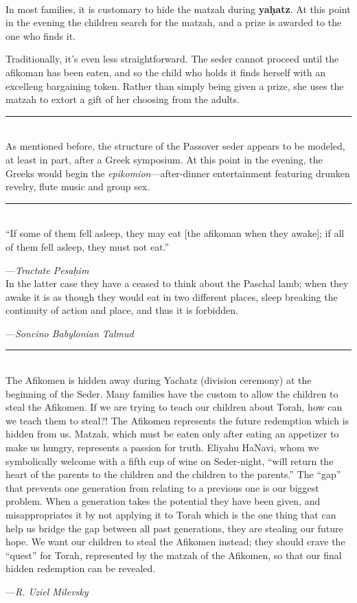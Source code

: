 \documentclass[a4paper,10pt,openany]{memoir}
\newcommand{\HgSource}[1]{\hfill{\small---\itshape{#1}}}
\newcommand{\HgFill}{\vfill \hrule \vfill}
\newenvironment{HgEnglish}{\strut\\\noindent}{\vspace{1em}}
\begin{document}
\begin{HgEnglish}
In most families, it is customary to hide the matzah during {\bfseries
ya\d{h}atz}. At this point in the evening the children search for the matzah,
and a prize is awarded to the one who finds it.

Traditionally, it's even less straightforward. The seder cannot proceed until
the afikoman has been eaten, and so the child who holds it finds herself with an
excelleng bargaining token. Rather than simply being given a prize, she uses the
matzah to extort a gift of her choosing from the adults.
\end{HgEnglish}

\HgFill

\begin{HgEnglish}
  As mentioned before, the structure of the Passover seder appears to be
  modeled, at least in part, after a Greek symposium. At this point in the
  evening, the Greeks would begin the {\itshape epikomion}---after-dinner
  entertainment featuring drunken revelry, flute music and group sex.
\end{HgEnglish}

\HgFill

\begin{HgEnglish}
``If some of them fell asleep, they may eat [the afikoman when they awake]; if
all of them fell asleep, they must not eat.''

\HgSource{Tractate Pesa\d{h}im}\\

In the latter case they have a ceased to think about the Paschal lamb; when they
awake it is as though they would eat in two different places, sleep breaking the
continuity of action and place, and thus it is forbidden.

\HgSource{Soncino Babylonian Talmud}
\end{HgEnglish}

\HgFill

\begin{HgEnglish}
The Afikomen is hidden away during Yachatz (division ceremony) at the beginning
of the Seder. Many families have the custom to allow the children to steal the
Afikomen. If we are trying to teach our children about Torah, how can we teach
them to steal?! The Afikomen represents the future redemption which is hidden
from us. Matzah, which must be eaten only after eating an appetizer to make us
hungry, represents a passion for truth. Eliyahu HaNavi, whom we symbolically
welcome with a fifth cup of wine on Seder-night, ``will return the heart of the
parents to the children and the children to the parents.'' The ``gap'' that
prevents one generation from relating to a previous one is our biggest problem.
When a generation takes the potential they have been given, and misappropriates
it by not applying it to Torah which is the one thing that can help us bridge
the gap between all past generations, they are stealing our future hope. We want
our children to steal the Afikomen instead; they should crave the ``quest'' for
Torah, represented by the matzah of the Afikomen, so that our final hidden
redemption can be revealed. 

\HgSource{R. Uziel Milevsky}
\end{HgEnglish}
\end{document}
